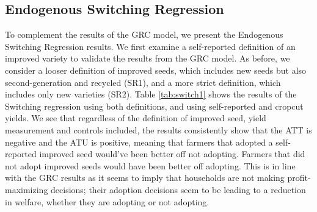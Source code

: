 \documentclass[11pt]{article}
\begin{document}



\subsection{Endogenous Switching Regression}

To complement the results of the GRC model, we present the Endogenous Switching Regression results. We first examine a self-reported definition of an improved variety to validate the results from the GRC model. As before, we consider a looser definition of improved seeds, which includes new seeds but also second-generation and recycled (SR1), and a more strict definition, which includes only new varieties (SR2). Table \ref{tab:switch1} shows the results of the Switching regression using both definitions, and using self-reported and cropcut yields. We see that regardless of the definition of improved seed, yield measurement and controls included, the results consistently show that the ATT is negative and the ATU is positive, meaning that farmers that adopted a self-reported improved seed would've been better off not adopting. Farmers that did not adopt improved seeds would have been better off adopting. This is in line with the GRC results as it seems to imply that households are not making profit-maximizing decisions; their adoption decisions seem to be leading to a reduction in welfare, whether they are adopting or not adopting.
\end{document}
